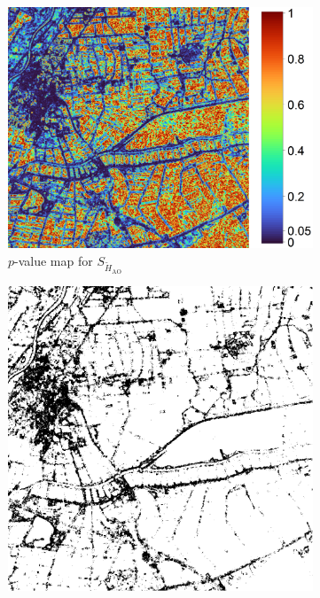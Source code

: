 \documentclass[
  lettersize  journal,
]{IEEEtran}%
\providecommand{\DIFaddtex}[1]{{\protect\color{blue}\uwave{#1}}} %
\providecommand{\DIFaddFL}[1]{\DIFadd{#1}} %
\providecommand{\DIFaddbeginFL}{} %
\providecommand{\DIFaddendFL}{} %
\providecommand{\DIFdelbeginFL}{} %
\providecommand{\DIFdelendFL}{} %
\providecommand{\DIFadd}[1]{\texorpdfstring{\DIFaddtex{#1}}{#1}} %
\newcommand{\DIFscaledelfig}{0.5}
\newlength{\DIFdelgraphicswidth} %
\newlength{\DIFdelgraphicsheight} %
\newcommand{\DIFaddincludegraphics}[2][]{{\color{blue}\fbox{\DIFOincludegraphics[#1]{#2}}}} %
\newcommand{\DIFdelincludegraphics}[2][]{%
\sbox{\DIFdelgraphicsbox}{\DIFOincludegraphics[#1]{#2}}%
\settoboxwidth{\DIFdelgraphicswidth}{\DIFdelgraphicsbox} %
\settoboxtotalheight{\DIFdelgraphicsheight}{\DIFdelgraphicsbox} %
\scalebox{\DIFscaledelfig}{%
\parbox[b]{\DIFdelgraphicswidth}{\usebox{\DIFdelgraphicsbox}\\[-\baselineskip] \rule{\DIFdelgraphicswidth}{0em}}\llap{\resizebox{\DIFdelgraphicswidth}{\DIFdelgraphicsheight}{%
\setlength{\unitlength}{\DIFdelgraphicswidth}%
\begin{picture}(1,1)%
\thicklines\linethickness{2pt} %
{\color[rgb]{1,0,0}\put(0,0){\framebox(1,1){}}}%
{\color[rgb]{1,0,0}\put(0,0){\line( 1,1){1}}}%
{\color[rgb]{1,0,0}\put(0,1){\line(1,-1){1}}}%
\end{picture}%
}\hspace*{3pt}}} %
} %
\DeclareRobustCommand{\DIFaddbeginFL}{\DIFOaddbeginFL \let\includegraphics\DIFaddincludegraphics} %
\DeclareRobustCommand{\DIFaddendFL}{\DIFOaddendFL \let\includegraphics\DIFOincludegraphics} %
\DeclareRobustCommand{\DIFdelbeginFL}{\DIFOdelbeginFL \let\includegraphics\DIFdelincludegraphics} %
\DeclareRobustCommand{\DIFdelendFL}{\DIFOaddendFL \let\includegraphics\DIFOincludegraphics} %
\begin{document}
\begin{figure}[hbt]
\begin{subfigure}{0.178\textwidth}
        \includegraphics[width=\linewidth]{./Figures-R1/p-values_shannon-munich_H.png}
        \DIFaddendFL \caption{$p$-value map for $S_{\widetilde{H}_{\text{AO}}}$}
        \DIFdelbeginFL %
\DIFdelendFL \DIFaddbeginFL \label{fig:munich-shann}
    \DIFaddendFL \end{subfigure}
   \DIFdelbeginFL %
\DIFdelendFL \DIFaddbeginFL \DIFaddFL{\hspace{0.00001\textwidth}
    }\begin{subfigure}{0.144\textwidth}
        \includegraphics[width=\linewidth]{./Figures-R1/H_005_shannon_munich.png}

\end{subfigure}
\end{figure}
\end{document}
